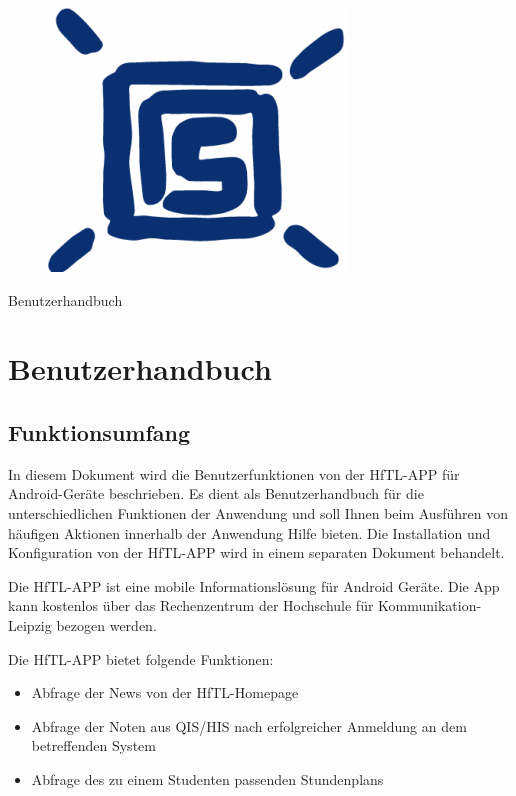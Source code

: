 \begin{figure}[h]
	\centering
	\includegraphics[scale=0.8]{03_Bedienungsanleitung/img/logo_stura.png}
	\label{img:grafik-dummy}
\end{figure}

\begin{center}
{\huge Benutzerhandbuch}
\end{center}


\newpage
\section{Benutzerhandbuch}
\subsection{Funktionsumfang}
In diesem Dokument wird die Benutzerfunktionen von der HfTL-APP für
Android-Geräte beschrieben. Es dient als Benutzerhandbuch für die
unterschiedlichen Funktionen der Anwendung und soll Ihnen beim
Ausführen von häufigen Aktionen innerhalb der Anwendung Hilfe bieten.
Die Installation und Konfiguration von der HfTL-APP wird in einem
separaten Dokument behandelt.

Die HfTL-APP ist eine mobile Informationslösung für Android Geräte. Die App kann kostenlos über das Rechenzentrum der Hochschule für Kommunikation-Leipzig bezogen werden.

Die HfTL-APP bietet folgende Funktionen:

\begin{itemize}
\item Abfrage der News von der HfTL-Homepage
\item Abfrage der Noten aus QIS/HIS nach erfolgreicher Anmeldung an dem betreffenden System
\item Abfrage des zu einem Studenten passenden Stundenplans
\end{itemize}

